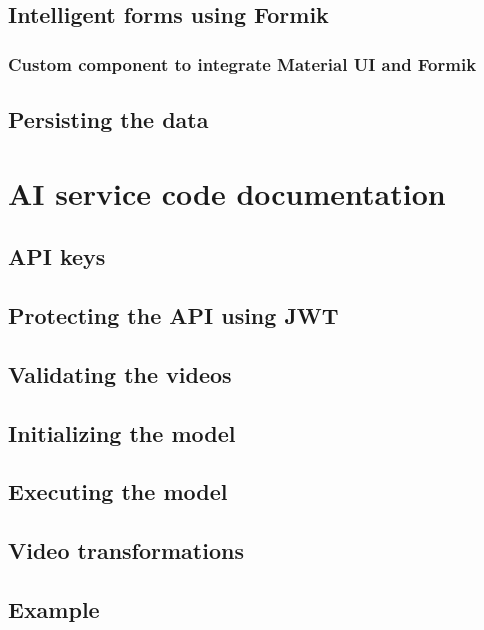     \subsection{Intelligent forms using Formik}
        \subsubsection{Custom component to integrate Material UI and Formik}
    \subsection{Persisting the data}

\newpage
\section{AI service code documentation}
    \subsection{API keys}
    \subsection{Protecting the API using JWT}
    \subsection{Validating the videos}
    \subsection{Initializing the model}
    \subsection{Executing the model}
        \subsection{Video transformations}
    \subsection{Example}
    
